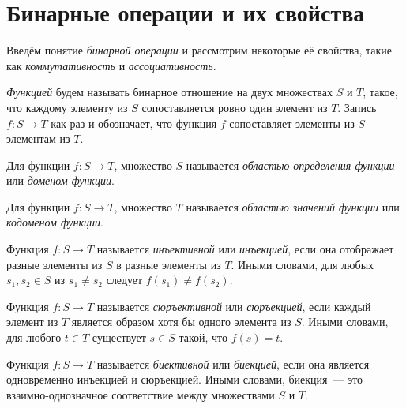 \section{Бинарные операции и их свойства}
\label{sec:BinaryOperations}

Введём понятие \emph{бинарной операции} и рассмотрим некоторые её свойства, такие как \emph{коммутативность} и \emph{ассоциативность}.

\begin{definition}[Функция]
    \emph{Функцией} будем называть бинарное отношение на двух множествах $S$ и $T$, такое, что каждому элементу из $S$ сопоставляется ровно один элемент из $T$.
    Запись $f: S \to T$ как раз и обозначает, что функция $f$ сопоставляет элементы из $S$ элементам из $T$.
\end{definition}

\begin{definition}
    Для функции $f: S \to T$, множество $S$ называется \emph{областью определения функции} или \emph{доменом функции}.
\end{definition}

\begin{definition}
    Для функции $f: S \to T$, множество $T$ называется \emph{областью значений функции} или \emph{кодоменом функции}.
\end{definition}

\begin{definition}[Инъекция]
    Функция $f: S \to T$ называется \emph{инъективной} или \emph{инъекцией}, если она отображает разные элементы из $S$ в разные элементы из $T$.
    Иными словами, для любых $s_1, s_2 \in S$ из $s_1 \neq s_2$ следует $f(s_1) \neq f(s_2)$.
\end{definition}

\begin{definition}[Сюръекция]
    Функция $f: S \to T$ называется \emph{сюръективной} или \emph{сюръекцией}, если каждый элемент из $T$ является образом хотя бы одного элемента из $S$.
    Иными словами, для любого $t \in T$ существует $s \in S$ такой, что $f(s) = t$.
\end{definition}

\begin{definition}[Биекция]
    Функция $f: S \to T$ называется \emph{биективной} или \emph{биекцией}, если она является одновременно инъекцией и сюръекцией.
    Иными словами, биекция~--- это взаимно-однозначное соответствие между множествами $S$ и $T$.
\end{definition}

